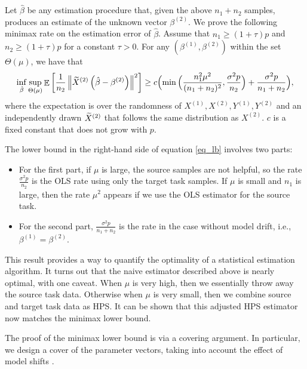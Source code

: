 Let $\hat\beta$ be any estimation procedure that, given the above $n_1 + n_2$ samples, produces an estimate of the unknown vector $\beta^{(2)}$.
We prove the following minimax rate on the estimation error of $\hat\beta$.
Assume that $n_1 \ge (1+\tau) p$ and $n_2 \ge (1+\tau) p$ for a constant $\tau>0$.
For any $(\beta^{(1)}, \beta^{(2)})$ within the set $\Theta(\mu)$, we have that
\begin{align}
    \inf_{\hat\beta} \sup_{\Theta(\mu)} \ex{\frac 1 {n_2}\bignorm{\wt X^{(2)}\left(\hat\beta - \beta^{(2)}\right)}^2} \ge %
    c{\Big({\min\Big(\frac{n_1^2\mu^2}{(n_1+n_2)^2}, \frac{\sigma^2 p} {n_2} \Big) + \frac{\sigma^2 p} {n_1 + n_2}}\Big)}, \label{eq_lb}
\end{align}
where the expectation is over the randomness of $X^{(1)}, X^{(2)}, Y^{(1)}, Y^{(2)}$ and an independently drawn $\widetilde X^{(2)}$ that follows the same distribution as $X^{(2)}$.
$c$ is a fixed constant that does not grow with $p$.

The lower bound in the right-hand side of equation \eqref{eq_lb} involves two parts:
\begin{itemize}
    \item For the first part, if $\mu$ is large, the source samples are not helpful, so the rate $\frac{\sigma^2 p}{n_2}$ is the OLS rate using only the target task samples. If $\mu$ is small and $n_1$ is large, then the rate $\mu^2$ appears if we use the OLS estimator for the source task.

    \item For the second part, $\frac{\sigma^2 p} {n_1 + n_2}$ is the rate in the case without model drift, i.e., $\beta^{(1)}=\beta^{(2)}$.
\end{itemize}

This result provides a way to quantify the optimality of a statistical estimation algorithm.
It turns out that the naive estimator described above is nearly optimal, with one caveat.
When $\mu$ is very high, then we essentially throw away the source task data.
Otherwise when $\mu$ is very small, then we combine source and target task data as HPS.
It can be shown that this adjusted HPS estimator now matches the minimax lower bound.

The proof of the minimax lower bound is via a covering argument.
In particular, we design a cover of the parameter vectors, taking into account the effect of model shifts \citep{wainwright2019high}.


